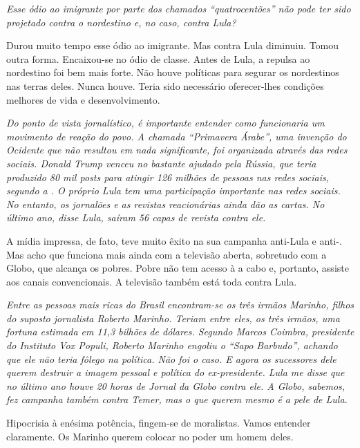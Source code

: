 \itshape
 Esse ódio ao imigrante por parte dos chamados
``quatrocentões'' não pode ter sido projetado contra o nordestino e, no
caso, contra Lula?

\normalfont
Durou muito tempo esse ódio ao imigrante. Mas contra Lula
diminuiu. Tomou outra forma. Encaixou-se no ódio de classe. Antes de
Lula, a repulsa ao nordestino foi bem mais forte. Não houve políticas
para segurar os nordestinos nas terras deles. Nunca houve. Teria sido
necessário oferecer-lhes condições melhores de vida e desenvolvimento.

\itshape
 Do ponto de vista jornalístico, é importante entender
como funcionaria um movimento de reação do povo. A chamada ``Primavera
Árabe'', uma invenção do Ocidente que não resultou em nada significante,
foi organizada através das redes sociais. Donald Trump venceu no 
bastante ajudado pela Rússia, que teria produzido 80 mil \emph{posts}
para atingir 126 milhões de pessoas nas redes sociais, segundo a . O
próprio Lula tem uma participação importante nas redes sociais. No
entanto, os jornalões e as revistas reacionárias ainda dão as cartas. No
último ano, disse Lula, saíram 56 capas de revista contra ele.

\normalfont
A mídia impressa, de fato, teve muito êxito na sua
campanha anti-Lula e anti-. Mas acho que funciona mais ainda com a
televisão aberta, sobretudo com a Globo, que alcança os pobres. Pobre
não tem acesso à  a cabo e, portanto, assiste aos canais
convencionais. A televisão também está toda contra Lula.

\itshape
 Entre as pessoas mais ricas do Brasil encontram-se os
três irmãos Marinho, filhos do suposto jornalista Roberto Marinho.
Teriam entre eles, os três irmãos, uma fortuna estimada em 11,3 bilhões
de dólares. Segundo Marcos Coimbra, presidente do Instituto Vox Populi,
Roberto Marinho engoliu o ``Sapo Barbudo'', achando que ele não teria
fôlego na política. Não foi o caso. E agora os sucessores dele querem
destruir a imagem pessoal e política do ex-presidente. Lula me disse que
no último ano houve 20 horas de Jornal da Globo contra ele. A Globo,
sabemos, fez campanha também contra Temer, mas o que querem mesmo é a
pele de Lula.

\normalfont
Hipocrisia à enésima potência, fingem-se de moralistas.
Vamos entender claramente. Os Marinho querem colocar no poder um homem
deles.

